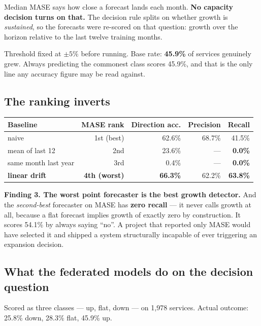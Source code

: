 \documentclass[11pt,a4paper]{article}
\newcommand{\keypoint}[1]{%
  \par\vspace{0.4em}%
  \noindent\colorbox{fed!8}{\parbox{0.98\textwidth}{\vspace{0.2em}#1\vspace{0.2em}}}%
  \par\vspace{0.4em}}
\begin{document}
Median MASE says how close a forecast lands each month. \textbf{No capacity decision turns on that.}
The decision rule splits on whether growth is \emph{sustained}, so the forecasts were re-scored on that
question: growth over the horizon relative to the last twelve training months.

Threshold fixed at $\pm5\%$ before running. Base rate: \textbf{45.9\%} of services genuinely grew.
Always predicting the commonest class scores 45.9\%, and that is the only line any accuracy figure may
be read against.

\subsection{The ranking inverts}

\begin{center}
\begin{tabular}{@{}lrrrr@{}}
\toprule
\textbf{Baseline} & \textbf{MASE rank} & \textbf{Direction acc.} & \textbf{Precision} & \textbf{Recall} \\
\midrule
naive & 1st (best) & 62.6\% & 68.7\% & 41.5\% \\
mean of last 12 & 2nd & 23.6\% & --- & \textbf{0.0\%} \\
same month last year & 3rd & 0.4\% & --- & \textbf{0.0\%} \\
\textbf{linear drift} & \textbf{4th (worst)} & \textbf{66.3\%} & 62.2\% & \textbf{63.8\%} \\
\bottomrule
\end{tabular}
\end{center}

\keypoint{\textbf{Finding 3. The worst point forecaster is the best growth detector.} And the
\emph{second-best} forecaster on MASE has \textbf{zero recall} --- it never calls growth at all,
because a flat forecast implies growth of exactly zero by construction. It scores 54.1\% by always
saying ``no''. A project that reported only MASE would have selected it and shipped a system
structurally incapable of ever triggering an expansion decision.}

\subsection{What the federated models do on the decision question}

Scored as three classes --- up, flat, down --- on 1{,}978 services. Actual outcome: 25.8\% down, 28.3\%
flat, 45.9\% up.
\end{document}
